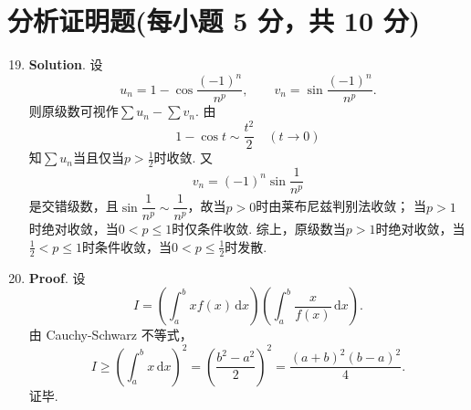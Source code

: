 \documentclass[../Main.tex]{subfiles}
\begin{document}
\section{分析证明题(每小题 5 分，共 10 分)}
\begin{enumerate}
    \setcounter{enumi}{18}
    \item \textbf{Solution}. 设
          \[
              u_{n}=1-\cos\frac{(-1)^{n}}{n^{p}},\qquad v_{n}=\sin\frac{(-1)^{n}}{n^{p}}.
          \]
          则原级数可视作$\sum u_{n}-\sum v_{n}$.
          由
          \[
              1-\cos t\sim \frac{t^{2}}{2}\quad(t\to0)
          \]
          知$\sum u_{n}$当且仅当$p>\frac12$时收敛.
          又
          \[
              v_{n}=(-1)^{n}\sin\frac{1}{n^{p}}
          \]
          是交错级数，且$\sin\dfrac1{n^{p}}\sim \dfrac1{n^{p}}$，故当$p>0$时由莱布尼兹判别法收敛；
          当$p>1$时绝对收敛，当$0<p\le1$时仅条件收敛.
          综上，原级数当$p>1$时绝对收敛，当$\frac12<p\le1$时条件收敛，当$0<p\le\frac12$时发散.

    \item \textbf{Proof}. 设
          \[
              I=\left(\int_{a}^{b}xf(x)\,\mathrm{d}x\right)\left(\int_{a}^{b}\frac{x}{f(x)}\,\mathrm{d}x\right).
          \]
          由 Cauchy-Schwarz 不等式，
          \[
              I\ge\left(\int_{a}^{b}x\,\mathrm{d}x\right)^{2}
              =\left(\frac{b^{2}-a^{2}}{2}\right)^{2}
              =\frac{(a+b)^{2}(b-a)^{2}}{4}.
          \]
          证毕.
\end{enumerate}
\end{document}
